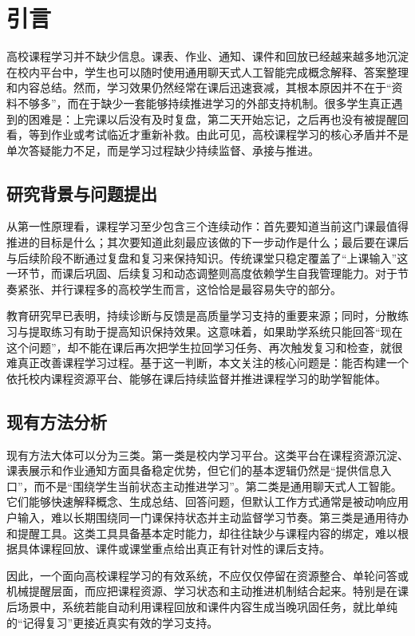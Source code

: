 \documentclass[zihao=-4]{ctexart}
\begin{document}
\section{引言}
高校课程学习并不缺少信息。课表、作业、通知、课件和回放已经越来越多地沉淀在校内平台中，学生也可以随时使用通用聊天式人工智能完成概念解释、答案整理和内容总结。然而，学习效果仍然经常在课后迅速衰减，其根本原因并不在于“资料不够多”，而在于缺少一套能够持续推进学习的外部支持机制。很多学生真正遇到的困难是：上完课以后没有及时复盘，第二天开始忘记，之后再也没有被提醒回看，等到作业或考试临近才重新补救。由此可见，高校课程学习的核心矛盾并不是单次答疑能力不足，而是学习过程缺少持续监督、承接与推进。

\subsection{研究背景与问题提出}
从第一性原理看，课程学习至少包含三个连续动作：首先要知道当前这门课最值得推进的目标是什么；其次要知道此刻最应该做的下一步动作是什么；最后要在课后与后续阶段不断通过复盘和复习来保持知识。传统课堂只稳定覆盖了“上课输入”这一环节，而课后巩固、后续复习和动态调整则高度依赖学生自我管理能力。对于节奏紧张、并行课程多的高校学生而言，这恰恰是最容易失守的部分。

教育研究早已表明，持续诊断与反馈是高质量学习支持的重要来源\cite{bloom1984}；同时，分散练习与提取练习有助于提高知识保持效果\cite{cepeda2006,dunlosky2013,karpicke2011}。这意味着，如果助学系统只能回答“现在这个问题”，却不能在课后再次把学生拉回学习任务、再次触发复习和检查，就很难真正改善课程学习过程。基于这一判断，本文关注的核心问题是：能否构建一个依托校内课程资源平台、能够在课后持续监督并推进课程学习的助学智能体。

\subsection{现有方法分析}
现有方法大体可以分为三类。第一类是校内学习平台。这类平台在课程资源沉淀、课表展示和作业通知方面具备稳定优势，但它们的基本逻辑仍然是“提供信息入口”，而不是“围绕学生当前状态主动推进学习”。第二类是通用聊天式人工智能。它们能够快速解释概念、生成总结、回答问题，但默认工作方式通常是被动响应用户输入，难以长期围绕同一门课保持状态并主动监督学习节奏。第三类是通用待办和提醒工具。这类工具具备基本定时能力，却往往缺少与课程内容的绑定，难以根据具体课程回放、课件或课堂重点给出真正有针对性的课后支持。

因此，一个面向高校课程学习的有效系统，不应仅仅停留在资源整合、单轮问答或机械提醒层面，而应把课程资源、学习状态和主动推进机制结合起来。特别是在课后场景中，系统若能自动利用课程回放和课件内容生成当晚巩固任务，就比单纯的“记得复习”更接近真实有效的学习支持。
\end{document}
